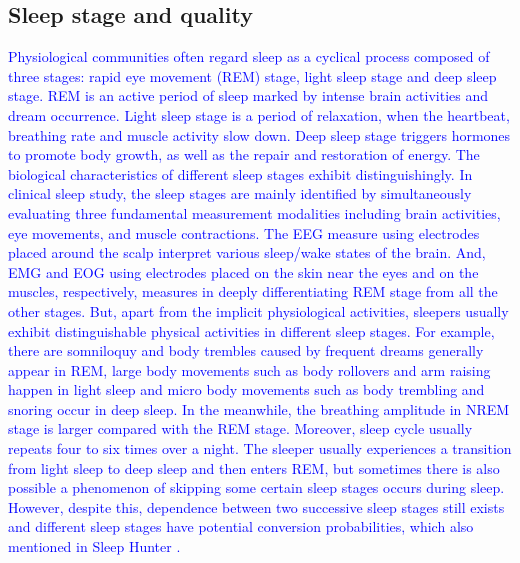 \subsection{Sleep stage and quality}
\textcolor{blue}{Physiological communities often regard sleep as a cyclical process composed of three stages: rapid eye movement (REM) stage, light sleep stage and deep sleep stage. REM is an active period of sleep marked by intense brain activities and dream occurrence. Light sleep stage is a period of relaxation, when the heartbeat, breathing rate and muscle activity slow down. Deep sleep stage triggers hormones to promote body growth, as well as the repair and restoration of energy.  The biological characteristics of different sleep stages exhibit distinguishingly. In clinical sleep study, the sleep stages are mainly identified by simultaneously evaluating three fundamental measurement modalities including brain activities, eye movements, and muscle contractions. The EEG measure using electrodes placed around the scalp interpret various sleep/wake states of the brain. And, EMG and EOG using electrodes placed on the skin near the eyes and on the muscles, respectively, measures in deeply differentiating REM stage from all the other stages. But, apart from the implicit physiological activities, sleepers usually exhibit distinguishable physical activities in different sleep stages. For example, there are somniloquy and body trembles caused by frequent dreams generally appear in REM, large body movements such as body rollovers and arm raising happen in light sleep and micro body movements such as body trembling and snoring occur in deep sleep.  In the meanwhile, the breathing amplitude in NREM stage is larger compared with the REM stage. Moreover, sleep cycle usually repeats four to six times over a night. The sleeper usually experiences a transition from light sleep to deep sleep and then enters REM, but sometimes there is also possible a phenomenon of skipping some certain sleep stages occurs during sleep. However, despite this, dependence between two successive sleep stages still exists and different sleep stages have potential conversion probabilities, which also mentioned in Sleep Hunter \cite{gu2016sleep}. }

